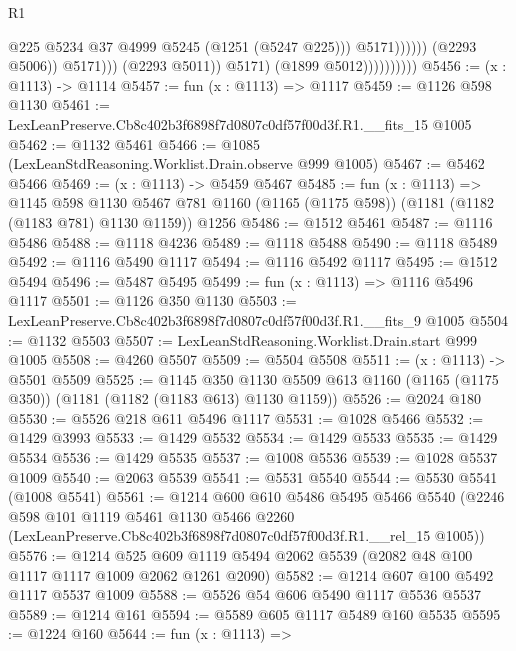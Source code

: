 \begin{lexlean}{R1}
\begin{coremodule}
                                                @225
                                                @5234
                                                @37
                                                @4999
                                                @5245
                                                (@1251 (@5247 @225)))
                                              @5171))))))
                                  (@2293 @5006))
                                @5171)))
                          (@2293 @5011))
                        @5171)
                      (@1899 @5012))))))))))
@5456 := (x : @1113) -> @1114
@5457 := fun (x : @1113) => @1117
@5459 := @1126 @598 @1130
@5461 := LexLeanPreserve.Cb8c402b3f6898f7d0807c0df57f00d3f.R1.__fits_15 @1005
@5462 := @1132 @5461
@5466 := @1085 (LexLeanStdReasoning.Worklist.Drain.observe @999 @1005)
@5467 := @5462 @5466
@5469 := (x : @1113) -> @5459 @5467
@5485 := fun (x : @1113) =>
  @1145
    @598
    @1130
    @5467
    @781
    @1160
    (@1165 (@1175 @598))
    (@1181 (@1182 (@1183 @781) @1130 @1159))
    @1256
@5486 := @1512 @5461
@5487 := @1116 @5486
@5488 := @1118 @4236
@5489 := @1118 @5488
@5490 := @1118 @5489
@5492 := @1116 @5490 @1117
@5494 := @1116 @5492 @1117
@5495 := @1512 @5494
@5496 := @5487 @5495
@5499 := fun (x : @1113) => @1116 @5496 @1117
@5501 := @1126 @350 @1130
@5503 := LexLeanPreserve.Cb8c402b3f6898f7d0807c0df57f00d3f.R1.__fits_9 @1005
@5504 := @1132 @5503
@5507 := LexLeanStdReasoning.Worklist.Drain.start @999 @1005
@5508 := @4260 @5507
@5509 := @5504 @5508
@5511 := (x : @1113) -> @5501 @5509
@5525 := @1145
    @350
    @1130
    @5509
    @613
    @1160
    (@1165 (@1175 @350))
    (@1181 (@1182 (@1183 @613) @1130 @1159))
@5526 := @2024 @180
@5530 := @5526 @218 @611 @5496 @1117
@5531 := @1028 @5466
@5532 := @1429 @3993
@5533 := @1429 @5532
@5534 := @1429 @5533
@5535 := @1429 @5534
@5536 := @1429 @5535
@5537 := @1008 @5536
@5539 := @1028 @5537 @1009
@5540 := @2063 @5539
@5541 := @5531 @5540
@5544 := @5530 @5541 (@1008 @5541)
@5561 := @1214
    @600
    @610
    @5486
    @5495
    @5466
    @5540
    (@2246
      @598
      @101
      @1119
      @5461
      @1130
      @5466
      @2260
      (LexLeanPreserve.Cb8c402b3f6898f7d0807c0df57f00d3f.R1.__rel_15 @1005))
@5576 := @1214
    @525
    @609
    @1119
    @5494
    @2062
    @5539
    (@2082 @48 @100 @1117 @1117 @1009 @2062 @1261 @2090)
@5582 := @1214 @607 @100 @5492 @1117 @5537 @1009
@5588 := @5526 @54 @606 @5490 @1117 @5536 @5537
@5589 := @1214 @161
@5594 := @5589 @605 @1117 @5489 @160 @5535
@5595 := @1224 @160
@5644 := fun (x : @1113) =>

\end{coremodule}
\end{lexlean}
